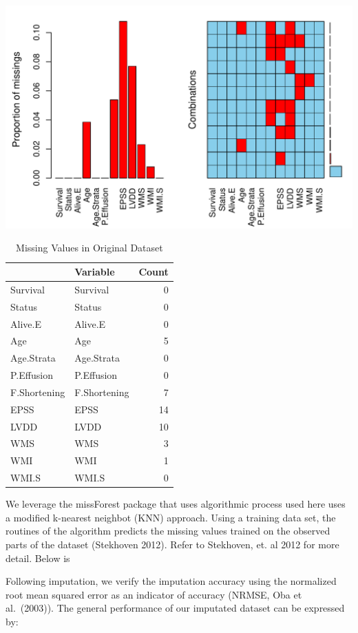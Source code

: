 \documentclass[
]{article}
\begin{document}
\includegraphics{markdown_files/figure-latex/missing.table-1.pdf}

\begin{table}[!h]

\caption{\label{tab:missing.table}Missing Values in Original Dataset}
\centering
\begin{tabular}[t]{l|l|r}
\hline
  & Variable & Count\\
\hline
Survival & Survival & 0\\
\hline
Status & Status & 0\\
\hline
Alive.E & Alive.E & 0\\
\hline
Age & Age & 5\\
\hline
Age.Strata & Age.Strata & 0\\
\hline
P.Effusion & P.Effusion & 0\\
\hline
F.Shortening & F.Shortening & 7\\
\hline
EPSS & EPSS & 14\\
\hline
LVDD & LVDD & 10\\
\hline
WMS & WMS & 3\\
\hline
WMI & WMI & 1\\
\hline
WMI.S & WMI.S & 0\\
\hline
\end{tabular}
\end{table}

We leverage the missForest package that uses algorithmic process used
here uses a modified k-nearest neighbot (KNN) approach. Using a training
data set, the routines of the algorithm predicts the missing values
trained on the observed parts of the dataset (Stekhoven 2012). Refer to
Stekhoven, et. al 2012 for more detail. Below is

Following imputation, we verify the imputation accuracy using the
normalized root mean squared error as an indicator of accuracy (NRMSE,
Oba et al.~(2003)). The general performance of our imputated dataset can
be expressed by:
\end{document}
